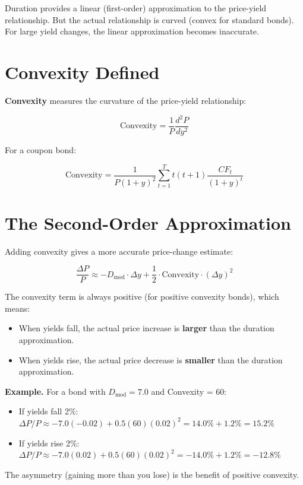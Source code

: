 \documentclass[11pt,letterpaper]{report}
\begin{document}
Duration provides a linear (first-order) approximation to the price-yield relationship.  But the actual relationship is curved (convex for standard bonds).  For large yield changes, the linear approximation becomes inaccurate.

\section{Convexity Defined}


\textbf{Convexity} measures the curvature of the price-yield relationship:

$$\text{Convexity} = \frac{1}{P} \frac{d^2P}{dy^2}$$

For a coupon bond:

$$\text{Convexity} = \frac{1}{P(1+y)^2} \sum_{t=1}^{T} t(t+1) \frac{CF_t}{(1+y)^t}$$

\section{The Second-Order Approximation}


Adding convexity gives a more accurate price-change estimate:

$$\frac{\Delta P}{P} \approx -D_{\text{mod}} \cdot \Delta y + \frac{1}{2} \cdot \text{Convexity} \cdot (\Delta y)^2$$

The convexity term is always positive (for positive convexity bonds), which means:

\begin{itemize}
  \item When yields fall, the actual price increase is \textbf{larger} than the duration approximation.
  \item When yields rise, the actual price decrease is \textbf{smaller} than the duration approximation.
\end{itemize}

\textbf{Example.}  For a bond with $D_{\text{mod}} = 7.0$ and Convexity = 60:

\begin{itemize}
  \item If yields fall 2\%: $\Delta P / P \approx -7.0(-0.02) + 0.5(60)(0.02)^2 = 14.0\% + 1.2\% = 15.2\%$
  \item If yields rise 2\%: $\Delta P / P \approx -7.0(0.02) + 0.5(60)(0.02)^2 = -14.0\% + 1.2\% = -12.8\%$
\end{itemize}

The asymmetry (gaining more than you lose) is the benefit of positive convexity.
\end{document}
